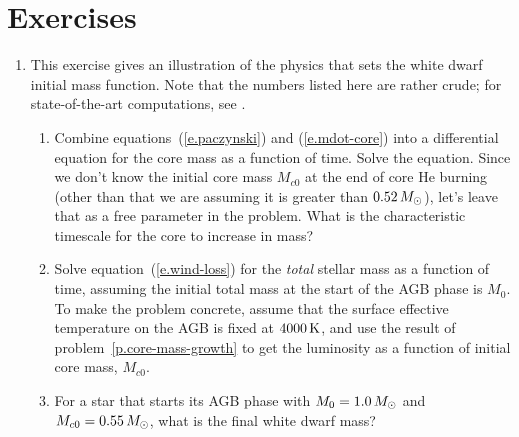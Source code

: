 \section{Exercises}\label{s.agb-exercises}

\begin{enumerate}
\item This exercise gives an illustration of the physics that sets the white dwarf initial mass function.
Note that the numbers listed here are rather crude; for state-of-the-art computations, see  \citet{Poelarends2008The-Supernova-C}.

\begin{enumerate}
\item\label{p.core-mass-growth} Combine equations~(\ref{e.paczynski}) and (\ref{e.mdot-core}) into a differential equation for the core mass as a function of time.  Solve the equation.  Since we don't know the initial core mass $M_{c0}$ at the end of core He burning (other than that we are assuming it is greater than $0.52\,M_\odot$), let's leave that as a free parameter in the problem. What is the characteristic timescale for the core to increase in mass?

\item Solve equation~(\ref{e.wind-loss}) for the \emph{total} stellar mass as a function of time, assuming the initial total mass at the start of the AGB phase is $M_{0}$.  To make the problem concrete, assume that
 the surface effective temperature on the AGB is fixed at $4000\,\mathrm{K}$,  and use the result of problem~\ref{p.core-mass-growth} to get the luminosity as a function of initial core mass, $M_{c0}$.

\item For a star that starts its AGB phase with $M_{0} = 1.0\,M_\odot$ and $M_{c0}=0.55\,M_\odot$, what is the final white dwarf mass?
\end{enumerate}
\end{enumerate}
